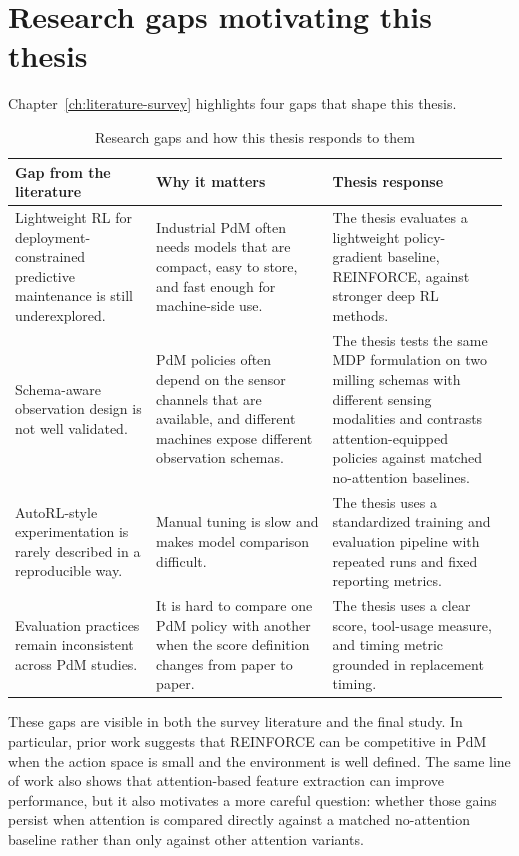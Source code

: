 \documentclass[12pt,oneside]{book}
\begin{document}
\section{Research gaps motivating this thesis}
Chapter~\ref{ch:literature-survey} highlights four gaps that shape this thesis.

\begin{table}[htbp]
\centering
\caption{Research gaps and how this thesis responds to them}
\label{tab:problem-gaps}
	\begin{tabular}{L{0.28\linewidth} L{0.35\linewidth} L{0.35\linewidth}}
	\toprule
	\textbf{Gap from the literature} & \textbf{Why it matters} & \textbf{Thesis response} \\
	\midrule
	Lightweight RL for deployment-constrained predictive maintenance is still underexplored. & Industrial PdM often needs models that are compact, easy to store, and fast enough for machine-side use. & The thesis evaluates a lightweight policy-gradient baseline, \textsc{REINFORCE}, against stronger deep RL methods. \\
	Schema-aware observation design is not well validated. & PdM policies often depend on the sensor channels that are available, and different machines expose different observation schemas. & The thesis tests the same MDP formulation on two milling schemas with different sensing modalities and contrasts attention-equipped policies against matched no-attention baselines. \\
	AutoRL-style experimentation is rarely described in a reproducible way. & Manual tuning is slow and makes model comparison difficult. & The thesis uses a standardized training and evaluation pipeline with repeated runs and fixed reporting metrics. \\
	Evaluation practices remain inconsistent across PdM studies. & It is hard to compare one PdM policy with another when the score definition changes from paper to paper. & The thesis uses a clear score, tool-usage measure, and timing metric grounded in replacement timing. \\
	\bottomrule
\end{tabular}
\end{table}

These gaps are visible in both the survey literature and the final study. In particular, prior work suggests that \textsc{REINFORCE} can be competitive in PdM when the action space is small and the environment is well defined. The same line of work also shows that attention-based feature extraction can improve performance, but it also motivates a more careful question: whether those gains persist when attention is compared directly against a matched no-attention baseline rather than only against other attention variants.
\end{document}
